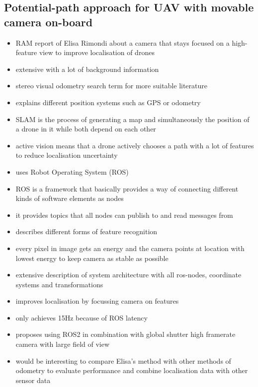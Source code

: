 \subsection{Potential-path approach for UAV with movable camera on-board}
\begin{itemize}
	\item RAM report of Elisa Rimondi about a camera that stays focused on a high-feature view to improve localisation of drones
	\item extensive with a lot of background information
	\item stereo visual odometry search term for more suitable literature
	\item explains different position systems such as GPS or odometry
	\item SLAM is the process of generating a map and simultaneously the position of a drone in it while both depend on each other
	\item active vision means that a drone actively chooses a path with a lot of features to reduce localisation uncertainty
	\item uses Robot Operating System (ROS) 
	\item ROS is a framework that basically provides a way of connecting different kinds of software elements as nodes
	\item it provides topics that all nodes can publish to and read messages from
	\item describes different forms of feature recognition
	\item every pixel in image gets an energy and the camera points at location with lowest energy to keep camera as stable as possible
	\item extensive description of system architecture with all ros-nodes, coordinate systems and transformations
	\item improves localisation by focussing camera on features
	\item only achieves 15Hz because of ROS latency
	\item proposes using ROS2 in combination with global shutter high framerate camera with large field of view
	\item would be interesting to compare Elisa's method with other methods of odometry to evaluate performance and combine localisation data with other sensor data
\end{itemize}

